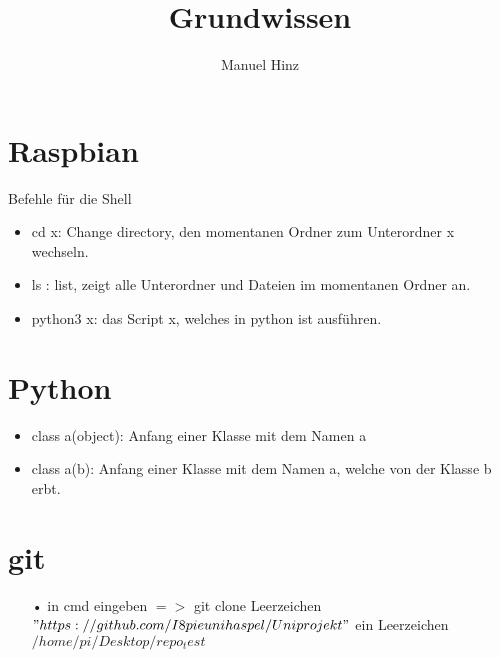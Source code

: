 \documentclass{article}
\author{Manuel Hinz}
\title{Grundwissen}
\begin{document}
\maketitle

\section{Raspbian}

Befehle f\"{u}r die Shell

\begin{itemize}

\item cd x: Change directory, den momentanen Ordner zum Unterordner x wechseln.

\item ls : list, zeigt alle Unterordner und Dateien im momentanen Ordner an.  

\item python3 x: das Script x, welches in python ist ausf\"{u}hren. 

\end{itemize}

\section{Python}

\begin{itemize}

\item class a(object): Anfang einer Klasse mit dem Namen a

\item class a(b): Anfang einer Klasse  mit dem Namen a, welche von der Klasse b erbt. 

\end{itemize}

\section{git}

\begin{itemize}

\item[•] in cmd eingeben $=>$ git clone Leerzeichen $"https://github.com/I8pieunihaspel/Uniprojekt"$ ein Leerzeichen $/home/pi/Desktop/repo_test$

\end{itemize}
\end{document}
